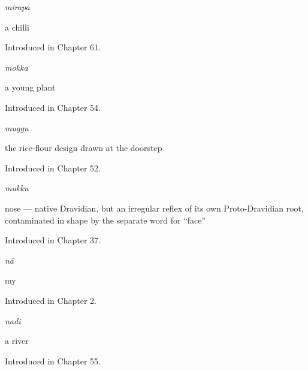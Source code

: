 \noindent\begin{minipage}[t]{\linewidth}
\raggedright
\textbf{}\enspace\emph{mirapa}\par
\small a chilli\par
\footnotesize Introduced in Chapter 61.
\end{minipage}\par\medskip

\noindent\begin{minipage}[t]{\linewidth}
\raggedright
\textbf{}\enspace\emph{mokka}\par
\small a young plant\par
\footnotesize Introduced in Chapter 54.
\end{minipage}\par\medskip

\noindent\begin{minipage}[t]{\linewidth}
\raggedright
\textbf{}\enspace\emph{muggu}\par
\small the rice-flour design drawn at the doorstep\par
\footnotesize Introduced in Chapter 52.
\end{minipage}\par\medskip

\noindent\begin{minipage}[t]{\linewidth}
\raggedright
\textbf{}\enspace\emph{mukku}\par
\small nose — native Dravidian, but an irregular reflex of its own Proto-Dravidian root, contaminated in shape by the separate word for \textquotedblleft{}face\textquotedblright{}\par
\footnotesize Introduced in Chapter 37.
\end{minipage}\par\medskip

\noindent\begin{minipage}[t]{\linewidth}
\raggedright
\textbf{}\enspace\emph{nā}\par
\small my\par
\footnotesize Introduced in Chapter 2.
\end{minipage}\par\medskip

\noindent\begin{minipage}[t]{\linewidth}
\raggedright
\textbf{}\enspace\emph{nadi}\par
\small a river\par
\footnotesize Introduced in Chapter 55.
\end{minipage}\par\medskip

